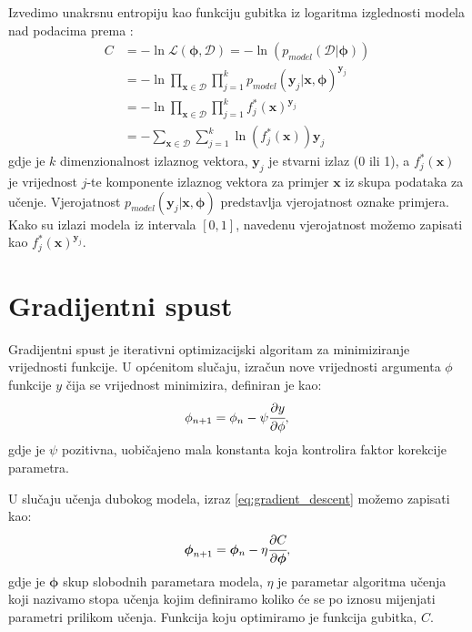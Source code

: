 \documentclass[times, utf8, diplomski, numeric]{fer}
\begin{document}
\noindent Izvedimo unakrsnu entropiju kao funkciju gubitka iz logaritma izglednosti modela nad podacima prema \citep{book:machine_learning}:
\begin{align}
 C &= - \ln \mathcal{L}(\boldsymbol{\phi}, \mathcal{D}) = - \ln (p_{model}(\mathcal{D} | \boldsymbol{\phi})) \nonumber \\
 &= - \ln \prod_{\mathbf{x} \in \mathcal{D}} \prod_{j=1}^{k} p_{model}(\mathbf{y}_j | \mathbf{x}, \boldsymbol{\phi})^{\mathbf{y}_j} \nonumber \\
 &= - \ln \prod_{\mathbf{x} \in \mathcal{D}} \prod_{j=1}^{k} f_j^*(\mathbf{x})^{\mathbf{y}_j} \nonumber \\
 &= - \sum_{\mathbf{x} \in \mathcal{D}} \sum_{j=1}^{k} \ln (f_j^*(\mathbf{x})) \mathbf{y}_j \label{eq:neg_log_likelihood}
\end{align}
gdje je $k$ dimenzionalnost izlaznog vektora, $\mathbf{y}_j$ je stvarni izlaz (0 ili 1), a $f_j^*(\mathbf{x})$ je vrijednost $j$-te komponente izlaznog vektora za primjer $\mathbf{x}$ iz skupa podataka za učenje.
Vjerojatnost $p_{model}(\mathbf{y}_j | \mathbf{x}, \boldsymbol{\phi})$ predstavlja vjerojatnost oznake primjera. Kako su izlazi modela iz intervala $\left[ 0, 1\right]$,
navedenu vjerojatnost možemo zapisati kao $f_j^*(\mathbf{x})^{\mathbf{y}_j}$.

\section{Gradijentni spust}

Gradijentni spust je iterativni optimizacijski algoritam za minimiziranje vrijednosti funkcije.
U općenitom slučaju, izračun nove vrijednosti argumenta $\phi$ funkcije $y$ čija se vrijednost minimizira, definiran je kao:
\begin{equation}
 \phi_{n+1} = \phi_n - \psi \cfrac{\partial y}{\partial \phi}, \label{eq:gradient_descent}
\end{equation}
gdje je $\psi$ pozitivna, uobičajeno mala konstanta koja kontrolira faktor korekcije parametra.

\noindent U slučaju učenja dubokog modela, izraz \ref{eq:gradient_descent} možemo zapisati kao:
\begin{equation}
 \boldsymbol{\phi}_{n+1} = \boldsymbol{\phi}{_n} - \eta \cfrac{\partial C}{\partial \boldsymbol{\phi}}, \label{eq:gradient_descent_neural}
\end{equation}
gdje je $\boldsymbol{\phi}$ skup slobodnih parametara modela, $\eta$ je parametar algoritma učenja koji nazivamo stopa učenja  kojim definiramo koliko će se po iznosu mijenjati parametri prilikom učenja.
Funkcija koju optimiramo je funkcija gubitka, $C$.
\end{document}
